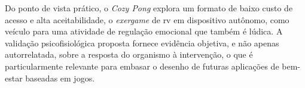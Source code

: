 Do ponto de vista prático, o \textit{Cozy Pong} explora um formato de baixo custo de acesso e alta aceitabilidade, o \textit{exergame} de \gls{rv} em dispositivo autônomo, como veículo para uma atividade de regulação emocional que também é lúdica. A validação psicofisiológica proposta fornece evidência objetiva, e não apenas autorrelatada, sobre a resposta do organismo à intervenção, o que é particularmente relevante para embasar o desenho de futuras aplicações de bem-estar baseadas em jogos.

